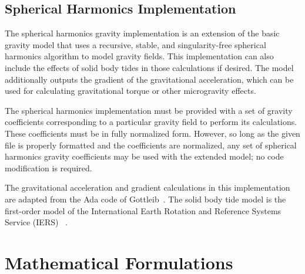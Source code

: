 \subsection{Spherical Harmonics Implementation}
The spherical harmonics gravity implementation is an extension of the basic
gravity model that uses a recursive, stable, and singularity-free spherical
harmonics algorithm to model gravity fields. This implementation can also
include the effects of solid body tides in those calculations if desired. The
model additionally outputs the gradient of the gravitational acceleration,
which can be used for calculating gravitational torque or other microgravity
effects.

The spherical harmonics implementation must be provided with a set of gravity
coefficients corresponding to a particular gravity field to perform its
calculations. These coefficients must be in fully normalized form. However, so
long as the given file is properly formatted and the coefficients are
normalized, any set of spherical harmonics gravity coefficients may be used
with the extended model; no code modification is required.

The gravitational acceleration and gradient calculations in this implementation
are adapted from the Ada code of Gottleib~\cite{JSC23762}. The solid body tide
model is the first-order model of the International
Earth Rotation and Reference Systems Service (IERS) ~\cite{IERS2003}.


\section{Mathematical Formulations}

